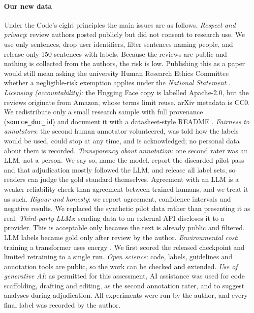 \documentclass[11pt]{article}
\begin{document}
\paragraph{Our new data} Under the Code's eight principles the main issues are as follows.
\emph{Respect and privacy}: review authors posted publicly but did not consent to research use. We use only sentences, drop user identifiers, filter sentences naming people, and release only 150 sentences with labels. Because the reviews are public and nothing is collected from the authors, the risk is low. Publishing this as a paper would still mean asking the university Human Research Ethics Committee whether a negligible-risk exemption applies under the \emph{National Statement} \citep{nhmrc2023statement}.
\emph{Licensing (accountability)}: the Hugging Face copy is labelled Apache-2.0, but the reviews originate from Amazon, whose terms limit reuse. arXiv metadata is CC0. We redistribute only a small research sample with full provenance (\texttt{source\_doc\_id}) and document it with a datasheet-style README \citep{gebru2021datasheets}.
\emph{Fairness to annotators}: the second human annotator volunteered, was told how the labels would be used, could stop at any time, and is acknowledged; no personal data about them is recorded. \emph{Transparency about annotation}: one second rater was an LLM, not a person. We say so, name the model, report the discarded pilot pass and that adjudication mostly followed the LLM, and release all label sets, so readers can judge the gold standard themselves. Agreement with an LLM is a weaker reliability check than agreement between trained humans, and we treat it as such.
\emph{Rigour and honesty}: we report agreement, confidence intervals and negative results. We replaced the synthetic pilot data rather than presenting it as real.
\emph{Third-party LLMs}: sending data to an external API discloses it to a provider. This is acceptable only because the text is already public and filtered. LLM labels became gold only after review by the author.
\emph{Environmental cost}: training a transformer uses energy \citep{strubell-etal-2019-energy}. We first scored the released checkpoint and limited retraining to a single run.
\emph{Open science}: code, labels, guidelines and annotation tools are public, so the work can be checked and extended.
\emph{Use of generative AI}: as permitted for this assessment, AI assistance was used for code scaffolding, drafting and editing, as the second annotation rater, and to suggest analyses during adjudication. All experiments were run by the author, and every final label was recorded by the author.
\end{document}

